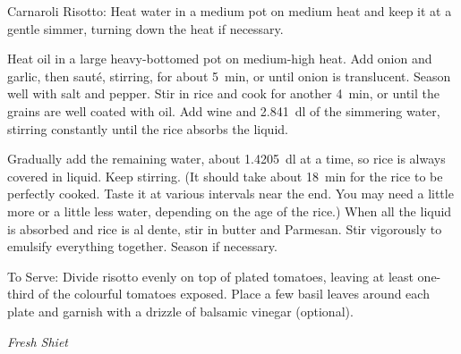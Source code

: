 \documentclass[a4paper]{article}
\newenvironment{instructions}[1]{\noindent\textsf{\textcolor{emphasis}{#1:}}}{\vspace{1ex}}
\begin{document}
\begin{minipage}[t][0.9\textheight]{0.8\textwidth}
                \begin{instructions}{Carnaroli Risotto} 
                        Heat water in a medium pot on medium heat and keep it at a gentle
                        simmer, turning down the heat if necessary. 

                        Heat oil in a large heavy-bottomed pot on medium-high heat. Add onion
                        and garlic, then sauté, stirring, for about \SI{5}{min}, or until onion
                        is translucent.  Season well with salt and pepper. Stir in rice and
                        cook for another \SI{4}{min}, or until the grains are well coated with
                        oil. Add wine and \SI{2.841}{dl} of the simmering water, stirring
                        constantly until the rice absorbs the liquid. 

                        Gradually add the remaining water, about \SI{1.4205}{dl} at a time, so
                        rice is always covered in liquid. Keep stirring. (It should take about
                        \SI{18}{min} for the rice to be perfectly cooked.  Taste it at various
                        intervals near the end. You may need a little more or a little less
                        water, depending on the age of the rice.) When all the liquid is
                        absorbed and rice is al dente, stir in butter and Parmesan.  Stir
                        vigorously to emulsify everything together. Season if necessary.
                \end{instructions}

                \begin{instructions}{To Serve} 
                        Divide risotto evenly on top of plated tomatoes, leaving at least
                        one-third of the colourful tomatoes exposed. Place a few basil leaves
                        around each plate and garnish with a drizzle of balsamic vinegar
                        (optional).
                \end{instructions} 
                
                \vfill
                {\centering\textit{\textcolor{emphasis}{Fresh Shiet}}\\}
\end{minipage}
\end{document}
